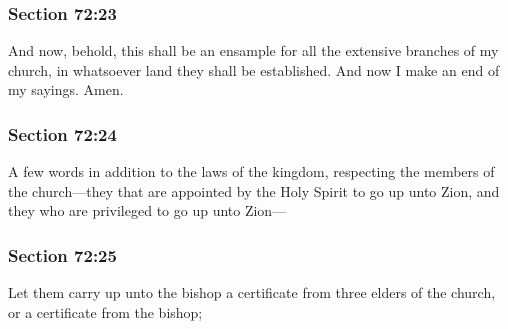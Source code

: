 	\subsubsection{Section 72:23} %
		\label{DC72-23}

		And now, behold, this shall be an ensample for all the extensive branches of my church, in whatsoever land they shall be established.  And now I make an end of my sayings.  Amen.


	\subsubsection{Section 72:24} %
		\label{DC72-24}

		A few words in addition to the laws of the kingdom, respecting the members of the church---they that are appointed by the Holy Spirit to go up unto Zion, and they who are privileged to go up unto Zion---


	\subsubsection{Section 72:25} %
		\label{DC72-25}

		Let them carry up unto the bishop a certificate from three elders of the church, or a certificate from the bishop;


